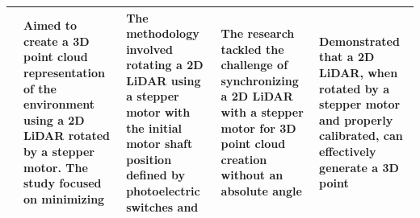 \begin{landscape}
\begin{table}[h]
\begin{threeparttable}
\begin{tabular}{p{2cm}  p{4.3cm} p{4.3cm} p{4.3cm} p{4.3cm}}
				\citet{yuan2021}                                                                                                                                                                                                                                         &
				Aimed to create a 3D point cloud representation of the environment using a 2D LiDAR rotated by a stepper motor. The study focused on minimizing                                                                                                          &
				The methodology involved rotating a 2D LiDAR using a stepper motor with the initial motor shaft position defined by photoelectric switches and                                                                                                           &
				The research tackled the challenge of synchronizing a 2D LiDAR with a stepper motor for 3D point cloud creation without an absolute angle                                                                                                                &
				Demonstrated that a 2D LiDAR, when rotated by a stepper motor and properly calibrated, can effectively generate a 3D point                                                                                                                                                                                                                               \\
				\midrule
			\end{tabular}
		\end{threeparttable}
	\end{table}
\end{landscape}

\newpage

